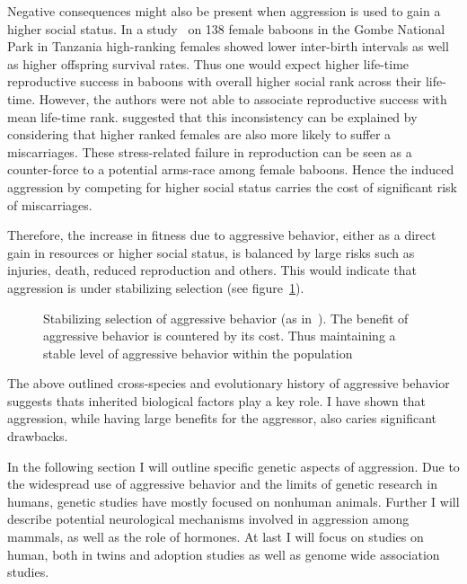 Negative consequences might also be present when aggression is used to gain a higher social status.
In a study~\cite{Packer1995} on 138 female baboons in the Gombe National Park in Tanzania high-ranking females showed lower inter-birth intervals as well as higher offspring survival rates.
Thus one would expect higher life-time reproductive success in baboons with overall higher social rank across their life-time.
However, the authors were not able to associate reproductive success with mean life-time rank.
\citet{Packer1995} suggested that this inconsistency can be explained by considering that higher ranked females are also more likely to suffer a  miscarriages.
These stress-related failure in reproduction can be seen as a counter-force to a potential arms-race among female baboons.
Hence the induced aggression by competing for higher social status carries the cost of significant risk of miscarriages.

Therefore, the increase in fitness due to aggressive behavior, either as a direct gain in resources or higher social status, is balanced by large risks such as injuries, death, reduced reproduction and others.
This would indicate that aggression is under stabilizing selection (see figure~\ref{fig:stab}).

\begin{figure}[hp]
	\centering
	\scalebox{0.6}{}
  \caption{Stabilizing selection of aggressive behavior (as in~\citet{Anholt2012}). The benefit of aggressive behavior is countered by its cost. Thus maintaining a stable level of aggressive behavior within the population}\label{fig:stab}
\end{figure}

The above outlined cross-species and evolutionary history of aggressive behavior suggests thats inherited biological factors play a key role.
I have shown that aggression, while having large benefits for the aggressor, also caries significant drawbacks.

In the following section I will outline specific genetic aspects of aggression.
Due to the widespread use of aggressive behavior and the limits of genetic research in humans, genetic studies have mostly focused on nonhuman animals.
Further I will describe potential neurological mechanisms involved in aggression among mammals, as well as the role of hormones.
At last I will focus on studies on human, both in twins and adoption studies as well as genome wide association studies.


